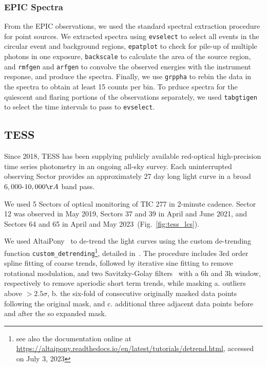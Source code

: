 \documentclass[twocolumn]{aastex631}
\begin{document}
\subsubsection{EPIC Spectra}
From the EPIC observations, we used the standard spectral extraction procedure for point sources. We extracted spectra using \texttt{evselect} to select all events in the circular event and background regions, \texttt{epatplot} to check for pile-up of multiple photons in one exposure, \texttt{backscale} to calculate the area of the source region, and \texttt{rmfgen} and \texttt{arfgen} to convolve the observed energies with the instrument response, and produce the spectra. Finally, we use \texttt{grppha} to rebin the data in the spectra to obtain at least 15 counts per bin. To prduce spectra for the quiescent and flaring portions of the observations separately, we used \texttt{tabgtigen} to select the time intervals to pass to \texttt{evselect}.

\subsection{TESS}
\label{sec:obs:tess}
Since 2018, TESS has been supplying publicly available red-optical high-precision time series photometry in an ongoing all-sky survey. Each uninterrupted observing Sector provides an approximately 27 day long light curve in a broad $6,000$-$10,000\AA$ band pass. 

We used 5 Sectors of optical monitoring of TIC 277 in 2-minute cadence. Sector 12 was observed in May 2019, Sectors 37 and 39 in April and June 2021, and Sectors 64 and 65 in April and May 2023~(Fig.~\ref{fig:tess_lcs}). 

We used AltaiPony~\citep{ilin2021altaipony} to de-trend the light curves using the custom de-trending function \texttt{custom\_detrending}\footnote{see also the documentation online at \url{https://altaipony.readthedocs.io/en/latest/tutorials/detrend.html}, accessed on July 3, 2023}, detailed in~\citet{ilin2022searching}. The procedure includes 3rd order spline fitting of coarse trends, followed by iterative sine fitting to remove rotational modulation, and two Savitzky-Golay filters~\citep{savitzky1964smoothing} with a 6h and 3h window, respectively to remove aperiodic short term trends, while masking a. outliers above $>2.5\sigma$, b. the six-fold of consecutive originally masked data points following the original mask, and c. additional three adjacent data points before and after the so expanded mask. 
\end{document}
